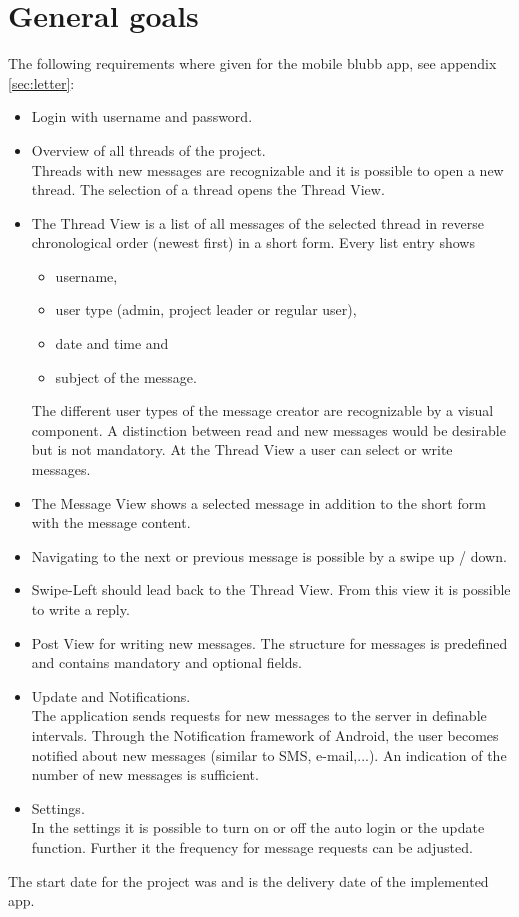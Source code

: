 \documentclass[12pt,a4paper,oneside]{report}
\begin{document}
\section{General goals} \label{goals}
The following requirements where given for the mobile blubb app, see appendix \ref{sec:letter}:
\begin{itemize}
\item Login with username and password.

\item Overview of all threads of the project.\\
Threads with new messages are recognizable and it is possible to open a new thread. The selection of a thread opens the Thread View.

\item The Thread View is a list of all messages of the selected thread in reverse chronological order (newest first) in a short form. Every list entry shows 
	\begin{itemize}
	\item username,
	\item user type (admin, project leader or regular 		user),
	\item date and time and
	\item subject of the message.
	\end{itemize} 
The different user types of the message creator are recognizable by a visual component. 
A distinction between read and new messages would be desirable but is not mandatory. 
At the Thread View a user can select or write messages.
\item The Message View shows a selected message in addition to the short form with the message content.
\item Navigating to the next or previous message is possible by a swipe up / down.
\item Swipe-Left should lead back to the Thread View. From this view it is possible to write a reply. 
\item Post View for writing new messages. The structure for messages is predefined and contains mandatory and optional fields.
\item Update and Notifications.\\
The application sends requests for new messages to the server in definable intervals. Through the Notification framework of Android, the user becomes notified about new messages (similar to SMS, e-mail,...). An indication of the number of new messages is sufficient.
\item Settings.\\
In the settings it is possible to turn on or off the auto login or the update function. Further it the frequency for message requests can be adjusted.
\end{itemize}
The start date for the project was   and  is the delivery date of the implemented app.
\end{document}
